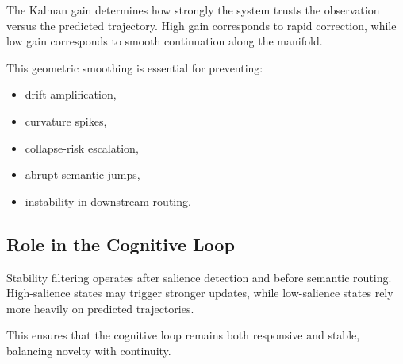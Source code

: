 The Kalman gain determines how strongly the system trusts the observation
versus the predicted trajectory. High gain corresponds to rapid correction,
while low gain corresponds to smooth continuation along the manifold.

This geometric smoothing is essential for preventing:

\begin{itemize}
\item drift amplification,
\item curvature spikes,
\item collapse-risk escalation,
\item abrupt semantic jumps,
\item instability in downstream routing.
\end{itemize}

\subsection{Role in the Cognitive Loop}

Stability filtering operates after salience detection and before semantic
routing. High-salience states may trigger stronger updates, while low-salience
states rely more heavily on predicted trajectories.

This ensures that the cognitive loop remains both responsive and stable,
balancing novelty with continuity.
